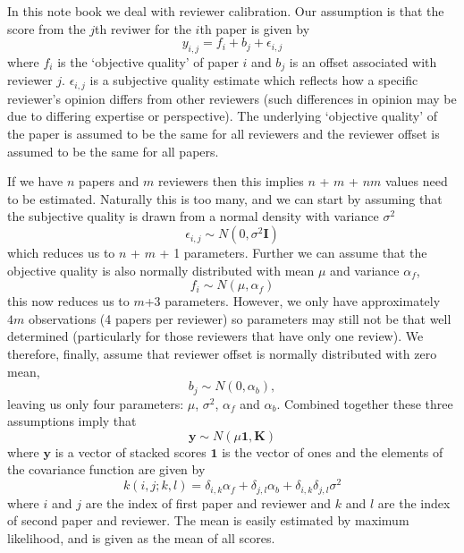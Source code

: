 \begin{flushright}
\end{flushright}

In this note book we deal with reviewer calibration. Our assumption is
that the score from the \(j\)th reviwer for the \(i\)th paper is given
by \[
y_{i,j} = f_i + b_j + \epsilon_{i, j}
\] where \(f_i\) is the `objective quality' of paper \(i\) and \(b_j\)
is an offset associated with reviewer \(j\). \(\epsilon_{i,j}\) is a
subjective quality estimate which reflects how a specific reviewer's
opinion differs from other reviewers (such differences in opinion may be
due to differing expertise or perspective). The underlying `objective
quality' of the paper is assumed to be the same for all reviewers and
the reviewer offset is assumed to be the same for all papers.

If we have \(n\) papers and \(m\) reviewers then this implies \(n\) +
\(m\) + \(nm\) values need to be estimated. Naturally this is too many,
and we can start by assuming that the subjective quality is drawn from a
normal density with variance \(\sigma^2\) \[
\epsilon_{i, j} \sim N(0, \sigma^2 \mathbf{I})
\] which reduces us to \(n\) + \(m\) + 1 parameters. Further we can
assume that the objective quality is also normally distributed with mean
\(\mu\) and variance \(\alpha_f\), \[
f_i \sim N(\mu, \alpha_f)
\] this now reduces us to \(m\)+3 parameters. However, we only have
approximately \(4m\) observations (4 papers per reviewer) so parameters
may still not be that well determined (particularly for those reviewers
that have only one review). We therefore, finally, assume that reviewer
offset is normally distributed with zero mean, \[
b_j \sim N(0, \alpha_b),
\] leaving us only four parameters: \(\mu\), \(\sigma^2\), \(\alpha_f\)
and \(\alpha_b\). Combined together these three assumptions imply that
\[
\mathbf{y} \sim N(\mu \mathbf{1}, \mathbf{K})
\] where \(\mathbf{y}\) is a vector of stacked scores \(\mathbf{1}\) is
the vector of ones and the elements of the covariance function are given
by \[
k(i,j; k,l) = \delta_{i,k} \alpha_f + \delta_{j,l} \alpha_b + \delta_{i, k}\delta_{j,l} \sigma^2
\] where \(i\) and \(j\) are the index of first paper and reviewer and
\(k\) and \(l\) are the index of second paper and reviewer. The mean is
easily estimated by maximum likelihood, and is given as the mean of all
scores.

